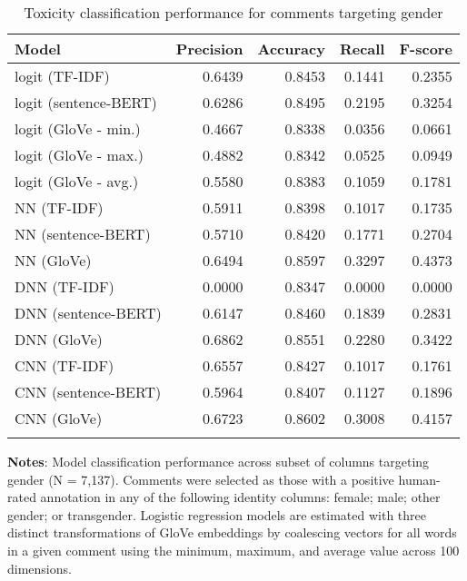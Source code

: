 \begin{table}[h]
	\caption{Toxicity classification performance for comments targeting gender \label{table:performance-gender}}
    \centering
	\begin{tabular}{lrrrr}
		\toprule
			Model &  Precision &  Accuracy &  Recall &  F-score \\
		\midrule
			\addlinespace{}
			\parbox{7.5cm}{logit (TF-IDF)} &    0.6439 &    0.8453 &  0.1441 &   0.2355 \\
			\addlinespace{}
			logit (sentence-BERT) &   0.6286 &    0.8495 &  0.2195 &   0.3254 \\
			\addlinespace{}
			logit (GloVe - min.) &     0.4667 &    0.8338 &  0.0356 &   0.0661 \\
			\addlinespace{}
			logit (GloVe - max.) &    0.4882 &    0.8342 &  0.0525 &   0.0949 \\
			\addlinespace{}
			logit (GloVe - avg.) &    0.5580 &    0.8383 &  0.1059 &   0.1781 \\
			\addlinespace{}
			NN (TF-IDF) &     0.5911 &    0.8398 &  0.1017 &   0.1735 \\
			\addlinespace{}
			NN (sentence-BERT) &     0.5710 &    0.8420 &  0.1771 &   0.2704 \\
			\addlinespace{}
			NN (GloVe) &     0.6494 &    0.8597 &  0.3297 &   0.4373 \\
			\addlinespace{}
			DNN (TF-IDF) &      0.0000 &    0.8347 &  0.0000 &   0.0000 \\
			\addlinespace{}
			DNN (sentence-BERT) &     0.6147 &    0.8460 &  0.1839 &   0.2831 \\
			\addlinespace{}
			DNN (GloVe) &     0.6862 &    0.8551 &  0.2280 &   0.3422 \\
			\addlinespace{}
			CNN (TF-IDF) &      0.6557 &    0.8427 &  0.1017 &   0.1761 \\
			\addlinespace{}
			CNN (sentence-BERT)  &    0.5964 &    0.8407 &  0.1127 &   0.1896 \\
			\addlinespace{}
			CNN (GloVe)  &     0.6723 &    0.8602 &  0.3008 &   0.4157 \\
	\bottomrule
	\addlinespace[1em]
	\end{tabular}
	\parbox{14.5cm}{\textbf{Notes}: Model classification performance across subset of columns targeting gender (N = 7,137). Comments were selected as those with a positive human-rated annotation in any of the following identity columns: female; male; other gender; or transgender. Logistic regression models are estimated with three distinct transformations of GloVe embeddings by coalescing vectors for all words in a given comment using the minimum, maximum, and average value across 100 dimensions.}
\end{table}


